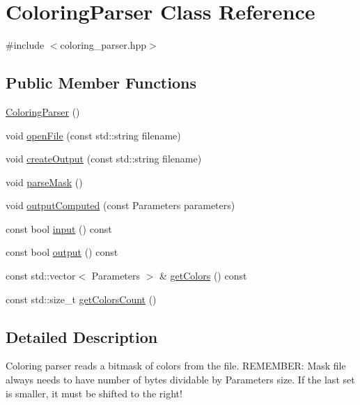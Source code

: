 \hypertarget{class_coloring_parser}{\section{Coloring\-Parser Class Reference}
\label{class_coloring_parser}
}


{\ttfamily \#include $<$coloring\-\_\-parser.\-hpp$>$}

\subsection*{Public Member Functions}
\begin{DoxyCompactItemize}
\item 
\hyperlink{class_coloring_parser_a4d741a7e828ea56737c90c5e0bef3397}{Coloring\-Parser} ()
\item 
void \hyperlink{class_coloring_parser_ade0d6f3c6e50b90cdc94f9d0debb86c0}{open\-File} (const std\-::string filename)
\item 
void \hyperlink{class_coloring_parser_a8f08d87f82c952f814fef8cbd8f670ee}{create\-Output} (const std\-::string filename)
\item 
void \hyperlink{class_coloring_parser_a2de61114bb7c1491df9597be18cfa466}{parse\-Mask} ()
\item 
void \hyperlink{class_coloring_parser_a604092dbecb99420ce63666fffb2edc4}{output\-Computed} (const Parameters parameters)
\item 
const bool \hyperlink{class_coloring_parser_a5c8d857b9296db6758e003fc1cbbaa52}{input} () const 
\item 
const bool \hyperlink{class_coloring_parser_a29f2691f394b9944f844f4b2e003e882}{output} () const 
\item 
const std\-::vector$<$ Parameters $>$ \& \hyperlink{class_coloring_parser_a4cf55e0e842e9a87064895e8b8e0b1e6}{get\-Colors} () const 
\item 
const std\-::size\-\_\-t \hyperlink{class_coloring_parser_ac112280b6a0ef6133219a51598b39176}{get\-Colors\-Count} ()
\end{DoxyCompactItemize}


\subsection{Detailed Description}
Coloring parser reads a bitmask of colors from the file. R\-E\-M\-E\-M\-B\-E\-R\-: Mask file always needs to have number of bytes dividable by Parameters size. If the last set is smaller, it must be shifted to the right! 

